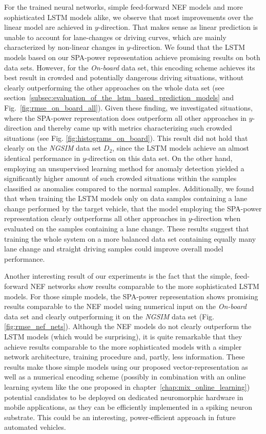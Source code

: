 For the trained neural networks, simple feed-forward \ac{NEF} models and more sophisticated \ac{LSTM} models alike, we observe that most improvements over the linear model are achieved in $y$-direction.
That makes sense as linear prediction is unable to account for lane-changes or driving curves, which are mainly characterized by non-linear changes in $y$-direction.
We found that the \ac{LSTM} models based on our \ac{SPA}-power representation achieve promising results on both data sets.
However, for the \emph{On-board} data set, this encoding scheme achieves its best result in crowded and potentially dangerous driving situations, without clearly outperforming the other approaches on the whole data set (see section~\ref{subsec:evaluation_of_the_lstm_based_prediction_models} and Fig.~\ref{fig:rmse_on_board_all}).
Given these finding, we investigated situations, where the \ac{SPA}-power representation does outperform all other approaches in $y$-direction and thereby came up with metrics characterizing such crowded situations (see Fig. \ref{fig:histograms_on_board}).
This result did not hold that clearly on the \emph{\ac{NGSIM}} data set $D_2$, since the \ac{LSTM} models achieve an almost identical performance in $y$-direction on this data set.
On the other hand, employing an unsupervised learning method for anomaly detection yielded a significantly higher amount of such crowded situations within the samples classified as anomalies compared to the normal samples.
Additionally, we found that when training the \ac{LSTM} models only on data samples containing a lane change performed by the target vehicle, that the model employing the \ac{SPA}-power representation clearly outperforms all other approaches in $y$-direction when evaluated on the samples containing a lane change.
These results suggest that training the whole system on a more balanced data set containing equally many lane change and straight driving samples could improve overall model performance.

Another interesting result of our experiments is the fact that the simple, feed-forward \ac{NEF} networks show results comparable to the more sophisticated \ac{LSTM} models.
For those simple models, the \ac{SPA}-power representation shows promising results comparable to the \ac{NEF} model using numerical input on the \emph{On-board} data set and clearly outperforming it on the \emph{\ac{NGSIM}} data set (Fig. \ref{fig:rmse_nef_nets}).
Although the \ac{NEF} models do not clearly outperform the \ac{LSTM} models (which would be surprising), it is quite remarkable that they achieve results comparable to the more sophisticated models with a simpler network architecture, training procedure and, partly, less information.
These results make those simple models using our proposed vector-representation as well as a numerical encoding scheme (possibly in combination with an online learning system like the one proposed in chapter~\ref{chap:mix_online_learning}) potential candidates to be deployed on dedicated neuromorphic hardware in mobile applications, as they can be efficiently implemented in a spiking neuron substrate.
This could be an interesting, power-efficient approach in future automated vehicles.

